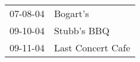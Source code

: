 \begin{supertabular}{p{0.25\columnwidth}p{0.75\columnwidth}}
 07-08-04 &           Bogart's \\
 09-10-04 &        Stubb's BBQ \\
 09-11-04 &  Last Concert Cafe \\
\end{supertabular}

